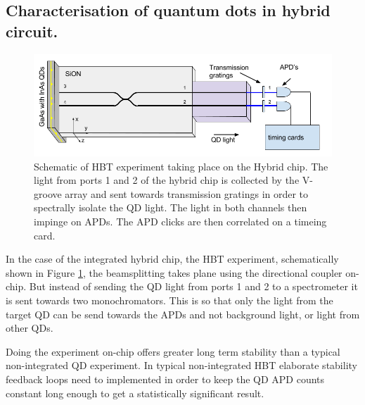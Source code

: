 \subsection{Characterisation of quantum dots in hybrid circuit.}

\begin{figure}[h!] \begin{center}
\includegraphics[width=1\textwidth]{images/hyb_hbt.png} \caption{
Schematic of HBT experiment taking place on the Hybrid chip. The light from
ports 1 and 2 of the hybrid chip is collected by the V-groove array and sent
towards transmission gratings in order to spectrally isolate the QD light.  The
light in both channels then impinge on APDs. The APD clicks are then correlated
on a timeing card.
} \label{fig:hyb_basic_hbt}\end{center} \end{figure}

In the case of the integrated hybrid chip, the HBT experiment, schematically shown in Figure
\ref{fig:hyb_basic_hbt}, the beamsplitting takes plane using the directional
coupler on-chip. But instead of sending the QD light from ports 1 and 2 to a
spectrometer it is sent towards two monochromators. This is so that only the
light from the target QD can be send towards the APDs and not background light,
or light from other QDs.

Doing the experiment on-chip offers greater long term stability than a typical non-integrated QD
experiment. In typical non-integrated HBT elaborate stability feedback loops
need to implemented in order to keep the QD APD counts constant long enough to
get a statistically significant result.
